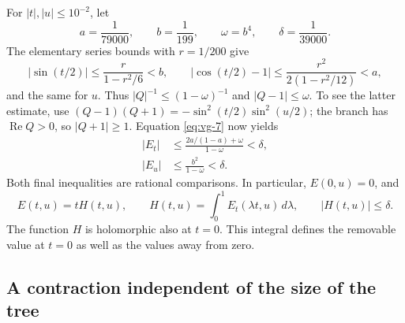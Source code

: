 For \(|t|,|u|\le10^{-2}\), let \begin{equation}\label{eq:vg-8}
a=\frac1{79000},\qquad b=\frac1{199},\qquad
 \omega=b^4,\qquad \delta=\frac1{39000}.
\end{equation} The elementary series bounds with \(r=1/200\) give \begin{equation}\label{eq:vg-9}
|\sin(t/2)|\le\frac{r}{1-r^2/6}<b,\qquad
 |\cos(t/2)-1|
       \le\frac{r^2}{2(1-r^2/12)}<a,
\end{equation} and the same for \(u\). Thus \(|Q|^{-1}\le(1-\omega)^{-1}\) and \(|Q-1|\le\omega\). To see the latter estimate, use \((Q-1)(Q+1)=-\sin^2(t/2)\sin^2(u/2)\); the branch has \(\operatorname{Re}Q>0\), so \(|Q+1|\ge1\). Equation \eqref{eq:vg-7} now yields \begin{equation}\label{eq:vg-10}
\begin{split}
 |E_t|&\le
       \frac{2a/(1-a)+\omega}{1-\omega}<\delta,\\
 |E_u|&\le\frac{b^2}{1-\omega}<\delta.
 \end{split}
\end{equation} Both final inequalities are rational comparisons. In particular, \(E(0,u)=0\), and \begin{equation}\label{eq:vg-11}
E(t,u)=tH(t,u),\qquad
 H(t,u)=\int_0^1 E_t(\lambda t,u)\,d\lambda,\qquad
 |H(t,u)|\le\delta.
\end{equation} The function \(H\) is holomorphic also at \(t=0\). This integral defines the removable value at $t=0$ as well as the
values away from zero.

\subsection{A contraction independent of the size of the tree}\label{sec:vg-3}

